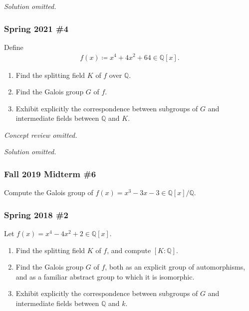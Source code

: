 \emph{Solution omitted.}

\hypertarget{spring-2021-4}{%
\subsubsection{Spring 2021 \#4}\label{spring-2021-4}}

Define
\begin{align*}
f(x) \coloneqq x^4 + 4x^2 + 64 \in {\mathbb{Q}}[x]
.\end{align*}

\begin{enumerate}
\def\labelenumi{\alph{enumi}.}
\item
  Find the splitting field \(K\) of \(f\) over \({\mathbb{Q}}\).
\item
  Find the Galois group \(G\) of \(f\).
\item
  Exhibit explicitly the correspondence between subgroups of \(G\) and
  intermediate fields between \({\mathbb{Q}}\) and \(K\).
\end{enumerate}

\emph{Concept review omitted.}

\emph{Solution omitted.}

\hypertarget{fall-2019-midterm-6}{%
\subsubsection{Fall 2019 Midterm \#6}\label{fall-2019-midterm-6}}

Compute the Galois group of
\(f(x) = x^3-3x -3\in {\mathbb{Q}}[x]/{\mathbb{Q}}\).

\hypertarget{spring-2018-2}{%
\subsubsection{Spring 2018 \#2}\label{spring-2018-2}}

Let \(f(x) = x^4 - 4x^2 + 2 \in {\mathbb{Q}}[x]\).

\begin{enumerate}
\def\labelenumi{\alph{enumi}.}
\item
  Find the splitting field \(K\) of \(f\), and compute
  \([K: {\mathbb{Q}}]\).
\item
  Find the Galois group \(G\) of \(f\), both as an explicit group of
  automorphisms, and as a familiar abstract group to which it is
  isomorphic.
\item
  Exhibit explicitly the correspondence between subgroups of \(G\) and
  intermediate fields between \({\mathbb{Q}}\) and \(k\).
\end{enumerate}

